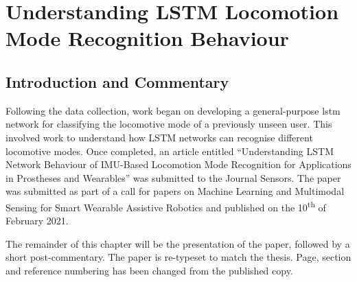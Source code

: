 \chapter{Understanding LSTM Locomotion Mode Recognition Behaviour}
\label{chp:lstm-general}

\section{Introduction and Commentary}
Following the data collection, work began on developing a general-purpose \acrfull{lstm} network for classifying the locomotive mode of a previously unseen user. This involved work to understand how LSTM  networks can recognise different locomotive modes. Once completed, an article entitled ``Understanding LSTM Network Behaviour of IMU-Based Locomotion Mode Recognition for Applications in Prostheses and Wearables'' was submitted to the Journal Sensors. The paper was submitted as part of a call for papers on Machine Learning and Multimodal Sensing for Smart Wearable Assistive Robotics and published on the 10\textsuperscript{th} of February 2021.

The remainder of this chapter will be the presentation of the paper, followed by a short post-commentary. The paper is re-typeset to match the thesis. Page, section and reference numbering has been changed from the published copy.



